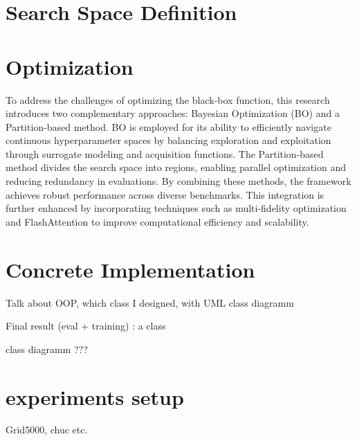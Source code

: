 \section{Search Space Definition}
\label{sec:search_space}


\section{Optimization}
\label{sec:opt}
To address the challenges of optimizing the black-box function, this research introduces two complementary approaches: Bayesian Optimization (BO) and a Partition-based method. BO is employed for its ability to efficiently navigate continuous hyperparameter spaces by balancing exploration and exploitation through surrogate modeling and acquisition functions. The Partition-based method divides the search space into regions, enabling parallel optimization and reducing redundancy in evaluations. By combining these methods, the framework achieves robust performance across diverse benchmarks. This integration is further enhanced by incorporating techniques such as multi-fidelity optimization and FlashAttention to improve computational efficiency and scalability.


\section{Concrete Implementation}
\label{sec:concrete_impl}
Talk about OOP, which class I designed, with UML class diagramm

Final result (eval + training) : a class 

class diagramm ???

\section{experiments setup}
\label{sec:exp_setup}

Grid5000, chuc etc.


